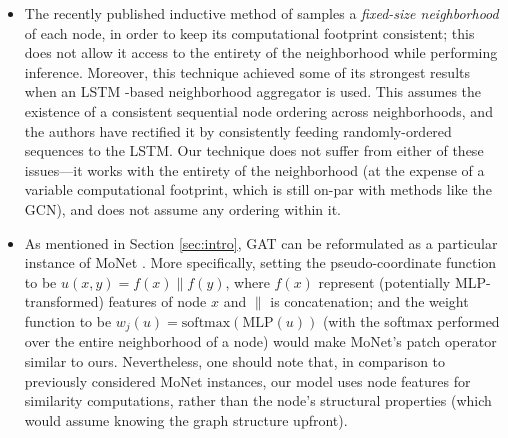 \documentclass{article} %
\begin{document}
\begin{itemize}
    \item The recently published inductive method of \cite{hamilton2017inductive} samples a \emph{fixed-size neighborhood} of each node, in order to keep its computational footprint consistent; this does not allow it access to the entirety of the neighborhood while performing inference. Moreover, this technique achieved some of its strongest results when an LSTM \citep{hochreiter1997long}-based neighborhood aggregator is used. This assumes the existence of a consistent sequential node ordering across neighborhoods, and the authors have rectified it by consistently feeding randomly-ordered sequences to the LSTM. Our technique does not suffer from either of these issues---it works with the entirety of the neighborhood (at the expense of a variable computational footprint, which is still on-par with methods like the GCN), and does not assume any ordering within it.
    \item As mentioned in Section \ref{sec:intro}, GAT can be reformulated as a particular instance of MoNet \citep{monti2016geometric}. More specifically, setting the pseudo-coordinate function to be $u(x, y) = f(x)\|f(y)$, where $f(x)$ represent (potentially MLP-transformed) features of node $x$ and $\|$ is concatenation; and the weight function to be $w_j(u) = \mathrm{softmax}(\mathrm{MLP}(u))$ (with the softmax performed over the entire neighborhood of a node) would make MoNet's patch operator similar to ours. Nevertheless, one should note that, in comparison to previously considered MoNet instances, our model uses node features for similarity computations, rather than the node's structural properties (which would assume knowing the graph structure upfront). %


\end{itemize}
\end{document}
